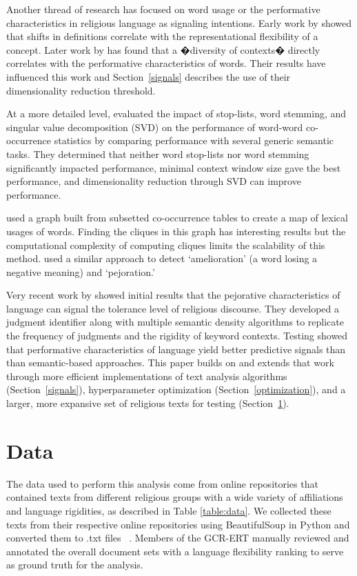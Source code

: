 \documentclass[11pt, a4paper]{article}
\begin{document}
Another thread of research has focused on word usage or the performative characteristics in religious language as signaling intentions. Early work by   showed that shifts in definitions correlate with the representational flexibility of a concept. Later work by  has found that a �diversity of contexts� directly correlates with the performative characteristics of words. Their results have influenced this work and Section~\ref{signals} describes the use of their dimensionality reduction threshold.

At a more detailed level,  evaluated the impact of stop-lists, word stemming, and singular value decomposition (SVD) on the performance of word-word co-occurrence statistics by comparing performance with several generic semantic tasks. They determined that neither word stop-lists nor word stemming significantly impacted performance, minimal context window size gave the best performance, and dimensionality reduction through SVD can improve performance.  

 used a graph built from subsetted co-occurrence tables to create a map of lexical usages of words. Finding the cliques in this graph has interesting results but the computational complexity of computing cliques limits the scalability of this method.  used a similar approach to detect `amelioration' (a word losing a negative meaning) and `pejoration.' 

Very recent work by  showed initial results that the pejorative characteristics of language can signal the tolerance level of religious discourse. They developed a judgment identifier along with multiple semantic density algorithms to replicate the frequency of judgments and the rigidity of keyword contexts. Testing showed that performative characteristics of language yield better predictive signals than than semantic-based approaches. This paper builds on and extends that work through more efficient implementations of text analysis algorithms (Section~\ref{signals}), hyperparameter optimization (Section~\ref{optimization}), and a larger, more expansive set of religious texts for testing (Section~\ref{data}).  

\section{Data}\label{data}

The data used to perform this analysis come from online repositories that contained texts from different religious groups with a wide variety of affiliations and language rigidities, as described in Table \ref{table:data}. We collected these texts from their respective online repositories using BeautifulSoup in Python and converted them to .txt files ~\cite{Richardson2015}. Members of the GCR-ERT manually reviewed and annotated the overall document sets with a language flexibility ranking to serve as ground truth for the analysis.
\end{document}
